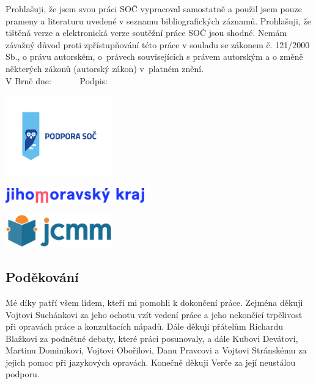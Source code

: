 \documentclass[12pt]{report}
\begin{document}
Prohlašuji, že jsem svou práci SOČ vypracoval samostatně a použil jsem pouze prameny a literaturu uvedené v seznamu bibliografických záznamů.
Prohlašuji, že tištěná verze a elektronická verze soutěžní práce SOČ jsou shodné. 
Nemám závažný důvod proti zpřístupňování této práce v souladu se zákonem č. 121/2000 Sb., o právu autorském, o~právech souvisejících s právem autorským a o změně některých zákonů (autorský zákon) v~platném znění. \\[1cm]
V Brně dne: \dotfill \ \ \ \ \ \  Podpis: \dotfill

\newpage
\thispagestyle{empty}
\begin{center}
\includegraphics[width=0.35\textwidth]{podpora_soc-horizontalni.png}
\end{center}
\vspace*{1.5cm}
\begin{center}
\includegraphics[width=0.45\textwidth]{logo_JMK_pruhledne.png}
\end{center}
\vspace*{2.2cm}
\begin{center}
\includegraphics[width=0.35\textwidth]{jcmm-logotype-positive1.png}
\end{center}
\vspace*{5.5cm}
\subsection*{Poděkování}
Mé díky patří všem lidem, kteří mi pomohli k dokončení práce. Zejména děkuji Vojtovi Suchánkovi za jeho ochotu vzít vedení práce a jeho nekončící trpělivost při opravách práce a konzultacích nápadů. Dále děkuji přátelům Richardu Blažkovi za podnětné debaty, které práci posunovaly, a dále Kubovi Devátovi, Martinu Dominikovi, Vojtovi Obořilovi, Danu Pravcovi a Vojtovi Stránskému za jejich pomoc při jazykových opravách. Konečně děkuji Verče za její neustálou podporu. 
\end{document}
